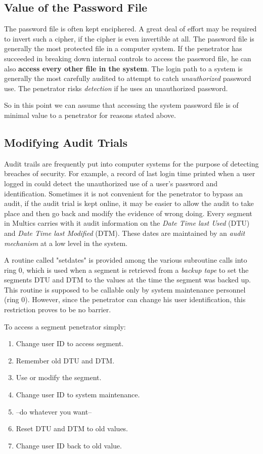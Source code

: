 \subsection{Value of the Password File}

The password file is often kept enciphered. A great deal of effort may be required to invert such a cipher, if the cipher 
is even invertible at all.
The password file is generally the most protected file in a computer system. If the penetrator has succeeded in breaking 
down internal controls to access the password file, he can also \textbf{access every other file in the system}.
The login path to a system is generally the most carefully audited to attempt to catch \textit{unauthorized} password use.
The penetrator risks \textit{detection} if he uses an unauthorized password.

So in this point we can assume that accessing the system password file is of minimal value to a penetrator for reasons 
stated above.

\subsection{Modifying Audit Trials}

Audit trails are frequently put into computer systems for the purpose of detecting breaches  of  security. 
For example, a record of last login time printed when a user logged in could detect the unauthorized 
use of a user’s password and identification.
Sometimes it is not convenient for the penetrator to bypass an audit, if the audit trial is kept online, 
it may be easier to allow the audit to take place and then go back and modify the evidence of wrong doing.
Every segment in Multics carries with it audit information on the \textit{Date Time last Used} (DTU) and
\textit{Date Time last Modified} (DTM). These dates are maintained by an \textit{audit mechanism} at a low 
level in the system.

A routine called "set\textunderscore dates" is provided among the various subroutine calls into ring 0, which is used when 
a segment is retrieved from a \textit{backup tape} to set the segments DTU and DTM to the values at the time the 
segment was backed up. This routine is supposed to be callable only by system maintenance personnel (ring 0).
However, since the penetrator can change his user identification, this restriction proves to be no barrier.

To access a segment penetrator simply:
\begin{enumerate}
    \item Change user ID to access segment.
    \item Remember old DTU and DTM.
    \item Use or modify the segment.
    \item Change user ID to system maintenance.
    \item --do whatever you want--
    \item Reset DTU and DTM to old values.
    \item Change user ID back to old value.
\end{enumerate}


